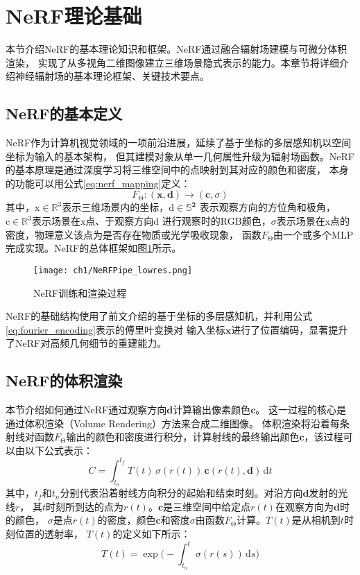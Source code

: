\newpage
\section{NeRF理论基础}
本节介绍NeRF的基本理论知识和框架。NeRF通过融合辐射场建模与可微分体积渲染，
实现了从多视角二维图像建立三维场景隐式表示的能力。本章节将详细介绍神经辐射场的基本理论框架、关键技术要点。

\subsection{NeRF的基本定义}
NeRF作为计算机视觉领域的一项前沿进展，延续了基于坐标的多层感知机以空间坐标为输入的基本架构，
但其建模对象从单一几何属性升级为辐射场函数。NeRF的基本原理是通过深度学习将三维空间中的点映射到其对应的颜色和密度，
本身的功能可以用公式\eqref{eq:nerf_mapping}定义：
\begin{equation}
  F_{\upTheta}:({\boldsymbol{x}},{\boldsymbol{d}})\rightarrow({\boldsymbol{c}},\sigma)
  \label{eq:nerf_mapping}
\end{equation}
其中，$\mathrm{x}\in\mathbb{R}^3$表示三维场景内的坐标，$\mathrm{d}\in\mathbb{S}^\boldsymbol{2}$
表示观察方向的方位角和极角，$\mathrm{c}\in\mathbb{R}^3$表示场景在$\mathrm{x}$点、于观察方向$\mathrm{d}$
进行观察时的RGB颜色，$\sigma$表示场景在$\mathrm{x}$点的密度，物理意义该点为是否存在物质或光学吸收现象，
函数$F_{\upTheta}$由一个或多个MLP完成实现。NeRF的总体框架如图\ref{fig:nerf_pipe}所示。
\begin{figure}[htbp]
  \centering
  \texttt{[image: ch1/NeRFPipe\_lowres.png]}
  \caption{NeRF训练和渲染过程\cite{Mildenhall_2020}}
  \label{fig:nerf_pipe}
\end{figure}

NeRF的基础结构使用了前文介绍的基于坐标的多层感知机，并利用公式\eqref{eq:fourier_encoding}表示的傅里叶变换对
输入坐标$\boldsymbol x$进行了位置编码，显著提升了NeRF对高频几何细节的重建能力。

\subsection{NeRF的体积渲染}

本节介绍如何通过NeRF通过观察方向$\boldsymbol d$计算输出像素颜色$\boldsymbol c$。
这一过程的核心是通过体积渲染（Volume Rendering）方法来合成二维图像。
体积渲染将沿着每条射线对函数$F_{\upTheta}$输出的颜色和密度进行积分，计算射线的最终输出颜色$\boldsymbol c$，该过程可以由以下公式表示：
\begin{equation}\label{eq:volume_rendering}
C=\int_{t_n}^{t_f}T(t)\,\sigma(r(t))\,{\boldsymbol c}(r(t),{\boldsymbol d})\,\mathrm{d}t
\end{equation}
其中，$t_f$和$t_n$分别代表沿着射线方向积分的起始和结束时刻。对沿方向$\boldsymbol{d}$发射的光线$r$，
其$t$时刻所到达的点为$r(t)$。$\boldsymbol{c}$是三维空间中给定点$r(t)$在观察方向为$\boldsymbol{d}$时的颜色，
$\sigma$是点$r(t)$的密度，颜色$\boldsymbol c$和密度$\sigma$由函数$F_{\upTheta}$计算。$T(t)$是从相机到$t$时刻位置的透射率，
$T(t)$的定义如下所示：
\begin{equation}\label{eq:transmittance}
T(t)=\exp\Biggl(-\int_{t_n}^{t}\sigma(r(s))\,\mathrm{d}s\Biggr)
\end{equation}

